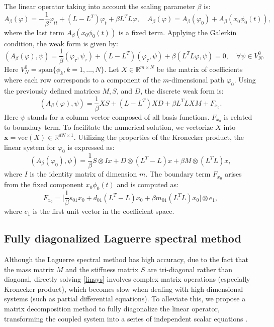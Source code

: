 \documentclass[a4paper,fleqn, 12pt]{cas-sc}
\numberwithin{table}{section}
\begin{document}
The linear operator taking into account the scaling parameter $\beta$ is:
\[
	A_{\beta} (\varphi) = - \dfrac{1}{\beta} \varphi_{tt} + (L - L^T) \varphi_t
	+ \beta L^T L \varphi, \quad A_{\beta} (\varphi) = A_{\beta} (\varphi_0) +
	A_{\beta}  (x_0 \phi_0 (t)),
\]
where the last term $A_{\beta}  (x_0 \phi_0 (t))$ is a fixed term. Applying the Galerkin condition, the weak form is given by:
\[
    (A_{\beta}(\varphi), \psi) = \frac{1}{\beta} (\varphi_\tau, \psi_\tau) + (L - L^T)(\varphi_\tau, \psi) + \beta (L^T L \varphi, \psi) = 0, \quad \forall \psi \in V_N^0.
\]
Here $V_N^0=\text{span}\{ \phi_k, k=1,\ldots, N \}$.
Let $X \in \mathbb{R}^{m \times N}$ be the matrix of coefficients where each row corresponds to a component of the $m$-dimensional path $\varphi_0$. Using the previously defined matrices $M, S$, and $D$, the discrete weak form is:
\[
    (A_{\beta}(\varphi), \psi) = \frac{1}{\beta} XS + (L - L^T) XD + \beta L^T L XM + F_{x_0}.
\]
Here $\psi$ stands for a column vector composed of all basis functions.
$F_{x_0}$ is related to boundary term. To facilitate the numerical solution, we vectorize $X$ into $\mathbf{x} = \text{vec}(X) \in \mathbb{R}^{dN \times 1}$. Utilizing the properties of the Kronecker product, the linear system for $\varphi_0$ is expressed as:
\begin{equation}
		\label{linsys} (A_{\beta} (\varphi_0), \psi) = \dfrac{1}{\beta} S \otimes Ix
		+ D \otimes (L^T - L) x + \beta M \otimes (L^T L) x,
	\end{equation}
where $I$ is the identity matrix of dimension $m$. The boundary term $F_{x_0}$ arises from the fixed component $x_0 \phi_0(t)$ and is computed as:
\begin{equation}
    \label{bound} F_{x_0} = \bigl[ \frac{1}{\beta} s_{01} x_0 + d_{01} (L^T - L) x_0 + \beta m_{01} (L^T L) x_0 \bigr] \otimes e_1,
\end{equation}
where $e_1$ is the first unit vector in the coefficient space.

\subsection{Fully diagonalized Laguerre spectral method}
Although the Laguerre spectral method has high accuracy, due to the fact that the mass matrix $M$ and the stiffness matrix $S$ are tri-diagonal rather than diagonal, directly solving \eqref{linsys} involves complex matrix operations (especially Kronecker product), which becomes slow when dealing with high-dimensional systems (such as partial differential equations). To alleviate this, we propose a matrix decomposition method to fully diagonalize the linear operator, transforming the coupled system into a series of independent scalar equations \citep{SHEN2007710}.
\end{document}
